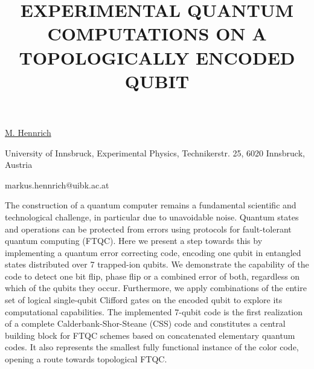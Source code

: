\title{EXPERIMENTAL QUANTUM COMPUTATIONS ON A TOPOLOGICALLY ENCODED QUBIT}

\underline{M. Hennrich} 

{\normalsize{\vspace{-4mm}
University of Innsbruck,
Experimental Physics,
Technikerstr. 25,
6020 Innsbruck,
Austria

\email markus.hennrich@uibk.ac.at}}

The construction of a quantum computer remains a fundamental scientific and technological challenge, in particular due to unavoidable noise. Quantum states and operations can be protected from errors using protocols for fault-tolerant quantum computing (FTQC). Here we present a step towards this by implementing a quantum error correcting code, encoding one qubit in entangled states distributed over 7 trapped-ion qubits. We demonstrate the capability of the code to detect one bit flip, phase flip or a combined error of both, regardless on which of the qubits they occur. Furthermore, we apply combinations of the entire set of logical single-qubit Clifford gates on the encoded qubit to explore its computational capabilities. The implemented 7-qubit code is the first realization of a complete Calderbank-Shor-Steane (CSS) code and constitutes a central building block for FTQC schemes based on concatenated elementary quantum codes. It also represents the smallest fully functional instance of the color code, opening a route towards topological FTQC.

\vspace{\baselineskip}
